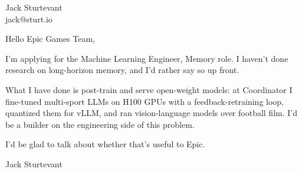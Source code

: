 \documentclass[11pt]{article}
\begin{document}
\raggedright

{\namefont\fontsize{20pt}{24pt}\selectfont Jack Sturtevant}\\[-0.3em]
jack@sturt.io

\vspace{1.2em}

Hello Epic Games Team,

I'm applying for the Machine Learning Engineer, Memory role. I haven't done research on long-horizon memory, and I'd rather say so up front.

What I have done is post-train and serve open-weight models: at Coordinator I fine-tuned multi-sport LLMs on H100 GPUs with a feedback-retraining loop, quantized them for vLLM, and ran vision-language models over football film. I'd be a builder on the engineering side of this problem.

I'd be glad to talk about whether that's useful to Epic.

\vspace{0.6em}
Jack Sturtevant
\end{document}
